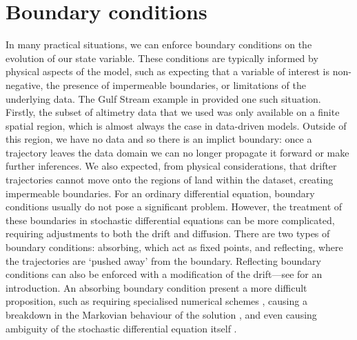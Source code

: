 \section{Boundary conditions}\label{sec:disc_bc}
In many practical situations, we can enforce boundary conditions on the evolution of our state variable.
These conditions are typically informed by physical aspects of the model, such as expecting that a variable of interest is non-negative, the presence of impermeable boundaries, or limitations of the underlying data.
The Gulf Stream example in  provided one such situation.
Firstly, the subset of altimetry data that we used was only available on a finite spatial region, which is almost always the case in data-driven models.
Outside of this region, we have no data and so there is an implict boundary: once a trajectory leaves the data domain we can no longer propagate it forward or make further inferences.
We also expected, from physical considerations, that drifter trajectories cannot move onto the regions of land within the dataset, creating impermeable boundaries.
For an ordinary differential equation, boundary conditions usually do not pose a significant problem.
However, the treatment of these boundaries in stochastic differential equations can be more complicated, requiring adjustments to both the drift and diffusion.
There are two types of boundary conditions: absorbing, which act as fixed points, and reflecting, where the trajectories are `pushed away' from the boundary.
Reflecting boundary conditions can also be enforced with a modification of the drift---see \citet{Pilipenko_2014_IntroductionStochasticDifferential} for an introduction.
An absorbing boundary condition present a more difficult proposition, such as requiring specialised numerical schemes \citep{Mannella_1999_AbsorbingBoundariesOptimal}, causing a breakdown in the Markovian behaviour of the solution \citep{Munoz_1998_NatureDifferentTypes}, and even causing ambiguity of the stochastic differential equation itself \citep{CorrealesEscudero_2019_ItoVsStratonovich}.


